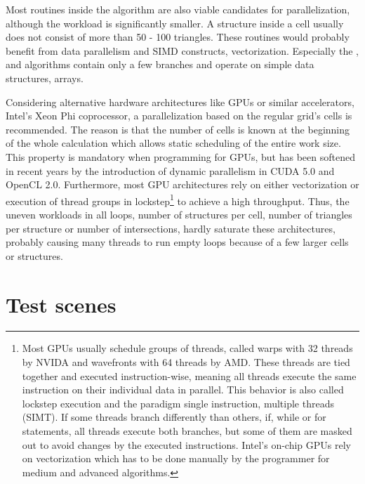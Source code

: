 Most routines inside the  algorithm are also viable candidates for parallelization, although the workload is significantly smaller.
A structure inside a cell usually does not consist of more than 50 - 100 triangles.
These routines would probably benefit from data parallelism and SIMD constructs, \ie vectorization.
Especially the ,  and  algorithms contain only a few branches and operate on simple data structures, \ie arrays.

Considering alternative hardware architectures like GPUs or similar accelerators, \eg Intel's Xeon Phi coprocessor, a parallelization based on the regular grid's cells is recommended.
The reason is that the number of cells is known at the beginning of the whole calculation which allows static scheduling of the entire work size.
This property is mandatory when programming for GPUs, but has been softened in recent years by the introduction of dynamic parallelism in CUDA 5.0 and OpenCL 2.0.
Furthermore, most GPU architectures rely on either vectorization or execution of thread groups in lockstep\footnote{
	Most GPUs usually schedule groups of threads, called warps with 32 threads by NVIDA and wavefronts with 64 threads by AMD.
	These threads are tied together and executed instruction-wise, meaning all threads execute the same instruction on their individual data in parallel.
	This behavior is also called lockstep execution and the paradigm single instruction, multiple threads (SIMT).
	If some threads branch differently than others, \eg if, while or for statements, all threads execute both branches, but some of them are masked out to avoid changes by the executed instructions.
	Intel's on-chip GPUs rely on vectorization which has to be done manually by the programmer for medium and advanced algorithms.} to achieve a high throughput.
Thus, the uneven workloads in all loops, \eg number of structures per cell, number of triangles per structure or number of intersections, hardly saturate these architectures, probably causing many threads to run empty loops because of a few larger cells or structures.


\section{Test scenes}
\label{sec:test_scenes}


